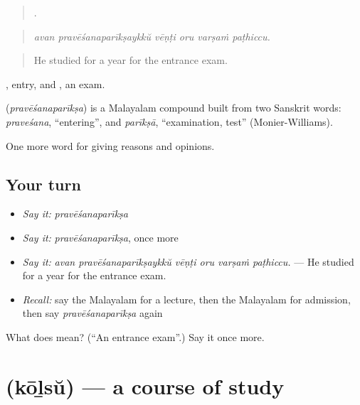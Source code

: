\begin{quote}
     .
\end{quote}

\begin{quote}
\emph{avan pravēśanaparīkṣaykkŭ vēṇṭi oru varṣaṁ paṭhiccu.}
\end{quote}

\begin{quote}
He studied for a year for the entrance exam.
\end{quote}

, entry, and , an exam.

\begin{cousinweb}
\textbf{} (\emph{pravēśanaparīkṣa}) is a Malayalam compound built from two Sanskrit words: \emph{praveśana}, \textquotedblleft{}entering\textquotedblright{}, and \emph{parīkṣā}, \textquotedblleft{}examination, test\textquotedblright{} (Monier-Williams).
\end{cousinweb}

\begin{grammarlens}[title={What you've built}]
One more word for giving reasons and opinions.
\end{grammarlens}

\subsection*{Your turn}
\begin{itemize}
\raggedright
  \item \emph{Say it:} \emph{pravēśanaparīkṣa}
  \item \emph{Say it:} \emph{pravēśanaparīkṣa}, once more
  \item \emph{Say it:} \emph{avan pravēśanaparīkṣaykkŭ vēṇṭi oru varṣaṁ paṭhiccu.} — He studied for a year for the entrance exam.
  \item \emph{Recall:} say the Malayalam for a lecture, then the Malayalam for admission, then say \emph{pravēśanaparīkṣa} again
\end{itemize}

\begin{tcolorbox}[breakable,colback=teal!4,colframe=teal!35!black,title={Before you move on}]
What does  mean? (\textquotedblleft{}An entrance exam\textquotedblright{}.) Say it once more.
\end{tcolorbox}
\section[\texorpdfstring{\ml{കോഴ്സ്} (kōḻsŭ)}{കോഴ്സ് (kōḻsŭ)}]{ (kōḻsŭ) — a course of study}

